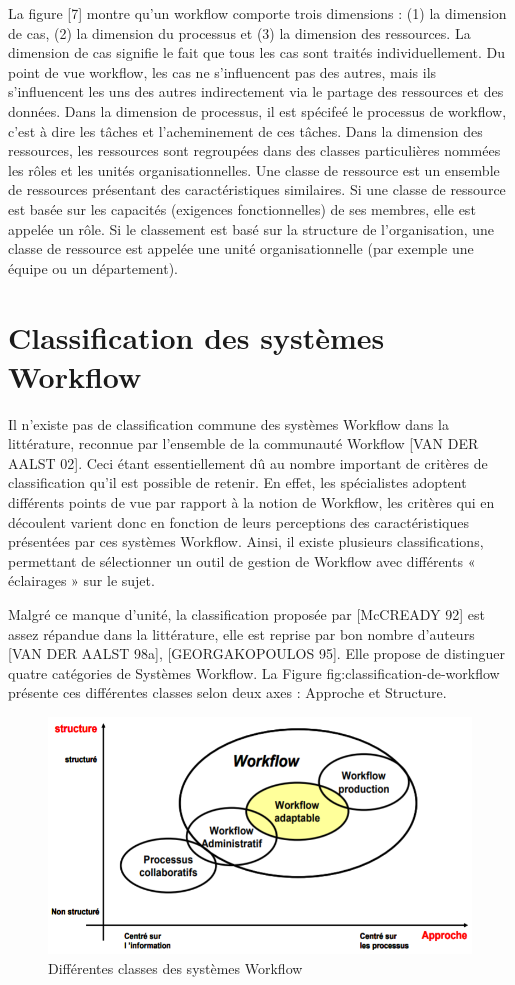 La figure  [7] montre qu'un workflow comporte trois dimensions : (1) la dimension de cas, (2) la dimension du processus et (3) la dimension des ressources. La dimension de cas signifie le fait que tous les cas sont traités individuellement. Du point de vue workflow, les cas ne s'influencent pas des autres, mais ils s'influencent les uns des autres indirectement via le partage des ressources et des données. Dans la dimension de processus, il est spécifeé le processus de workflow, c'est à dire les tâches et l'acheminement de ces tâches. Dans la dimension des ressources, les ressources sont regroupées dans des classes particulières nommées les rôles et les unités organisationnelles. Une classe de ressource est un ensemble de ressources présentant des caractéristiques similaires. Si une classe de ressource est basée sur les capacités (exigences fonctionnelles) de ses membres, elle est appelée un rôle. Si le classement est basé sur la structure de l'organisation, une classe de ressource est appelée une unité organisationnelle (par exemple une équipe ou un département). 

\section{Classification des systèmes Workflow}

Il n’existe pas de classification commune des systèmes Workflow dans la littérature, reconnue par l’ensemble de la communauté Workflow [VAN DER AALST 02]. Ceci étant essentiellement dû au nombre important de critères de classification qu’il est possible de retenir.
En effet, les spécialistes adoptent différents points de vue par rapport à la notion de Workflow, les critères qui en découlent varient donc en fonction de leurs perceptions des caractéristiques présentées par ces systèmes Workflow. Ainsi, il existe plusieurs classifications, permettant de sélectionner un outil de gestion de Workflow avec différents « éclairages » sur le sujet.

Malgré ce manque d’unité, la classification proposée par [McCREADY 92] est assez répandue dans la littérature, elle est reprise par bon nombre d’auteurs [VAN DER AALST 98a],
[GEORGAKOPOULOS 95]. Elle propose de distinguer quatre catégories de Systèmes Workflow. La Figure fig:classification-de-workflow présente ces différentes classes selon deux axes : Approche et Structure.

\begin{figure}[h]
	\centering
	\includegraphics[width=0.7\linewidth]{"images/classification de workflow"}
	\caption{ Différentes classes des systèmes Workflow 
}
	\label{fig:classification-de-workflow}
\end{figure}


